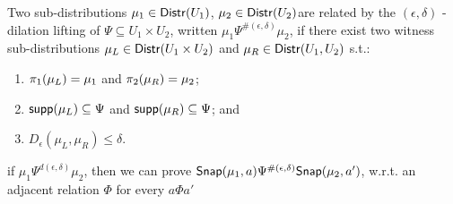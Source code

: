 \documentclass{article}
\begin{document}
\begin{defn}
Two sub-distributions $\mu_1 \in \mathsf{Distr}(U_1)$, $\mu_2 \in \mathsf{Distr}(U_2)$are related by the $(\epsilon, \delta)$ - dilation lifting of $\Psi \subseteq U_1 \times U_2$, written $\mu_1 \Psi^{\#(\epsilon, \delta)} \mu_2$, if there exist two witness sub-distributions $\mu_L \in \mathsf{Distr}(U_1 \times U_2)$ and $\mu_R \in \mathsf{Distr}(U_1, U_2)$ s.t.:
\begin{enumerate}
	\item $\pi_1(\mu_L) = \mu_1$ and $\pi_2(\mu_R) = \mu_2$;
	\item $\mathsf{supp}(\mu_L) \subseteq \Psi$ and $\mathsf{supp}(\mu_R) \subseteq \Psi$; and
	\item $D_{\epsilon}(\mu_L, \mu_R) \leq \delta$.
\end{enumerate}
\end{defn}

\begin{thm}
if $\mu_1 \Psi^{d(\epsilon, \delta)} \mu_2$, then we can prove $\mathsf{Snap}(\mu_1, a) \Psi^{\#(\epsilon, \delta)}\mathsf{Snap}(\mu_2, a')$, w.r.t. an adjacent relation $\Phi$ for every $a \Phi a'$
\end{thm}
\end{document}
